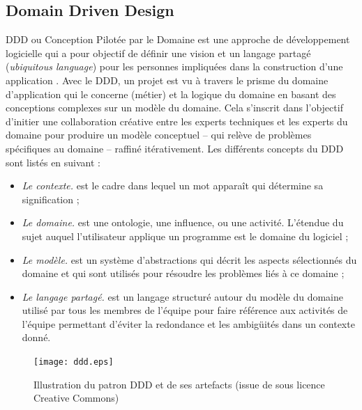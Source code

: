 \subsection{Domain Driven Design}
	
\gls{DDD} ou Conception Pilotée par le Domaine est une 
approche de 
développement logicielle qui a pour objectif de définir une vision et un langage 
partagé (\textit{ubiquitous language}) pour les personnes impliquées dans la 
construction d'une application \cite{Evans2003}.
Avec le \gls{DDD}, un projet est vu à travers le prisme du domaine d'application 
qui le concerne (métier) et la logique du domaine en basant des conceptions complexes
sur un modèle du domaine. Cela s'inscrit dans l'objectif d'initier une collaboration 
créative entre les experts techniques et les experts du domaine pour produire un modèle 
conceptuel -- qui relève de problèmes spécifiques au domaine -- raffiné itérativement.
Les différents concepts du \gls{DDD} sont listés en suivant :
\begin{itemize}
	\item \textit{Le contexte.} est le cadre dans lequel un mot apparaît qui détermine sa 
	signification ;
	\item \textit{Le domaine.} est une ontologie, une influence, ou une activité. 
	L'étendue du sujet auquel l'utilisateur applique un programme est le domaine 
	du logiciel ;
	\item \textit{Le modèle.} est un système d'abstractions qui décrit les aspects 
	sélectionnés du domaine et qui sont utilisés pour résoudre les problèmes liés 
	à ce domaine ;
	\item \textit{Le langage partagé.} est un langage structuré autour du modèle du 
	domaine utilisé par tous les membres de l'équipe pour faire référence aux 
	activités de l'équipe permettant d'éviter la redondance et les ambigüités dans
	un contexte donné.
\end{itemize}

\begin{figure}
	\noindent
	\centering
	\texttt{[image: ddd.eps]}
	\caption[Illustration du patron \gls{DDD} et de ses artefacts]{Illustration du 
	patron \gls{DDD} et de ses artefacts (issue de 
	\cite{Avram2006} sous licence Creative Commons)}
\label{fig:ddd}
\end{figure}

